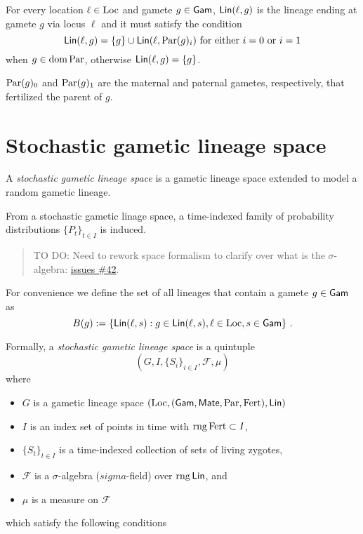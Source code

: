 \documentclass{article}
\begin{document}
For every location \(\ell \in \mathrm{Loc}\) and gamete \(g \in \mathsf{Gam}\),
\(\mathsf{Lin}(\ell, g)\) is the lineage ending at gamete \(g\) via locus
\(\ell\) and it must satisfy the condition \[
\mathsf{Lin}(\ell, g) = \{g\} \cup \mathsf{Lin}(\ell, \mathrm{Par}(g)_i) \text{ for either $i=0$ or $i=1$}
\] when \(g \in \operatorname{dom} \mathrm{Par}\), otherwise \(\mathsf{Lin}(\ell, g) = \{g\}\).

\(\mathrm{Par}(g)_0\) and \(\mathrm{Par}(g)_1\) are the maternal and paternal gametes,
respectively, that fertilized the parent of \(g\).

\section{Stochastic gametic lineage space}

A \emph{stochastic gametic lineage space} is a gametic lineage space
extended to model a random gametic lineage.

From a stochastic gametic linage space, a time-indexed family of
probability distributions \(\{ P_t \}_{t \in I}\) is induced.

\begin{quote}
TO DO: Need to rework space formalism to clarify over what is the
\(\sigma\)-algebra:
\href{https://gitlab.com/castedo/study-docs/-/issues/42}{issues \#42}.
\end{quote}

For convenience we define the set of all lineages that contain a gamete
\(g \in \mathsf{Gam}\) as \[
B(g) := \{ \mathsf{Lin}(\ell, s) : g \in \mathsf{Lin}(\ell,s), \ell \in \mathrm{Loc}, s \in \mathsf{Gam} \}
\text{ .}
\]

Formally, a \emph{stochastic gametic lineage space} is a quintuple \[
(G, I, \{ S_i \}_{i \in I}, \mathcal{F}, \mu)
\] where

\begin{itemize}
\item
  \(G\) is a gametic lineage space
  \((\mathrm{Loc}, (\mathsf{Gam}, \mathsf{Mate}, \mathrm{Par}, \mathrm{Fert}), \mathsf{Lin})\)
\item
  \(I\) is an index set of points in time with \(\operatorname{rng} \mathrm{Fert} \subset I\),
\item
  \(\{S_t\}_{t \in I}\) is a time-indexed collection of sets of living
  zygotes,
\item
  \(\mathcal{F}\) is a \(\sigma\)-algebra (\(sigma\)-field) over
  \(\operatorname{rng} \mathsf{Lin}\), and
\item
  \(\mu\) is a measure on \(\mathcal{F}\)
\end{itemize}

which satisfy the following conditions
\end{document}
